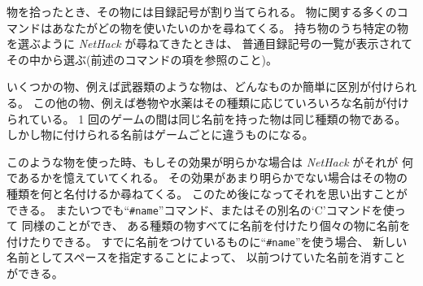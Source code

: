 物を拾ったとき、その物には目録記号が割り当てられる。
物に関する多くのコマンドはあなたがどの物を使いたいのかを尋ねてくる。
持ち物のうち特定の物を選ぶように {\it NetHack\/} が尋ねてきたときは、
普通目録記号の一覧が表示されてその中から選ぶ(前述のコマンドの項を参照のこと)。

いくつかの物、例えば武器類のような物は、どんなものか簡単に区別が付けられる。
この他の物、例えば巻物や水薬はその種類に応じていろいろな名前が付けられている。
1 回のゲームの間は同じ名前を持った物は同じ種類の物である。
しかし物に付けられる名前はゲームごとに違うものになる。

このような物を使った時、もしその効果が明らかな場合は {\it NetHack\/} がそれが
何であるかを憶えていてくれる。
その効果があまり明らかでない場合はその物の種類を何と名付けるか尋ねてくる。
このため後になってそれを思い出すことができる。
またいつでも``{\tt \#name}''コマンド、またはその別名の`C'コマンドを使って
同様のことができ、
ある種類の物すべてに名前を付けたり個々の物に名前を付けたりできる。
すでに名前をつけているものに``{\tt \#name}''を使う場合、
新しい名前としてスペースを指定することによって、
以前つけていた名前を消すことができる。

